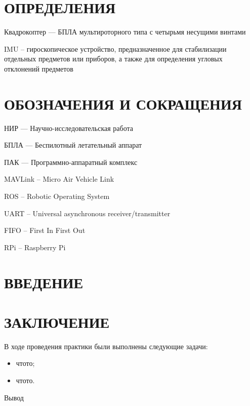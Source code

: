 \documentclass[a4paper,12pt]{article}
\begin{document}
\pagebreak
\thispagestyle{empty}

\section*{\centering ОПРЕДЕЛЕНИЯ}

\thispagestyle{empty} %

Квадрокоптер --- БПЛА мультироторного типа с четырьмя несущими винтами

IMU -- гироскопическое устройство, предназначенное для стабилизации отдельных предметов или приборов, а также для определения угловых отклонений предметов

\pagebreak
\thispagestyle{empty}

\section*{\centering ОБОЗНАЧЕНИЯ И СОКРАЩЕНИЯ}

НИР --- Научно-исследовательская работа

БПЛА --- Беспилотный летательный аппарат

ПАК --- Программно-аппаратный комплекс

MAVLink -- Micro Air Vehicle Link

ROS -- Robotic Operating System

UART -- Universal asynchronous receiver/transmitter

FIFO -- First In First Out

RPi -- Raspberry Pi

\pagebreak
\thispagestyle{empty}

\tableofcontents
\thispagestyle{empty}
\pagebreak

\section*{\centering ВВЕДЕНИЕ}
\setcounter{page}{3}
\pagebreak
\pagebreak
\pagebreak
\pagebreak
\pagebreak
\pagebreak

\section*{\centering ЗАКЛЮЧЕНИЕ}
В ходе проведения практики были выполнены следующие задачи:
\begin{itemize} 
	\item чтото;
	\item чтото.
\end{itemize}

Вывод

\pagebreak

\printbibliography

\pagebreak
\end{document}
